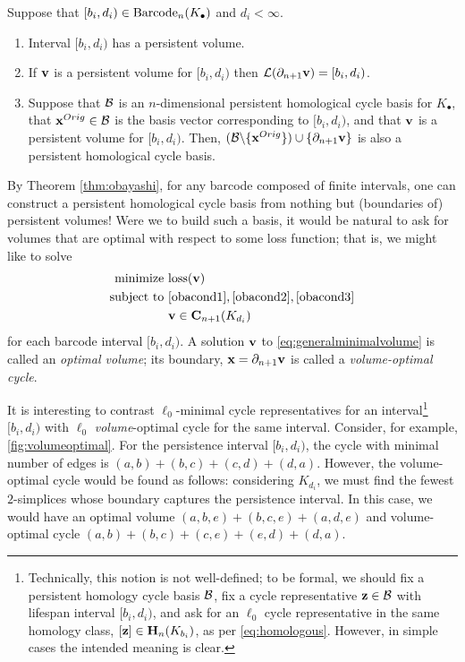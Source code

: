 %
\begin{theorem}  
\label{thm:obayashi}
Suppose that $[b_i, d_i) \in \mathrm{Barcode}_n(K_\bullet)$ and  $d_i < \infty$.
    \begin{enumerate}
        \item Interval $[b_i, d_i)$ has a persistent volume.
        \item If $\mathbf{v}$ is a persistent volume for $[b_i, d_i)$ then $\mathcal{L}(\partial_{n+1}\mathbf{v}) = [b_i, d_i)$.
        \item Suppose that $\mathcal B$ is an $n$-dimensional persistent homological cycle basis for $K_\bullet$, that $\mathbf{x}^{Orig} \in \mathcal B$ is the basis vector corresponding to $[b_i, d_i)$, and that $\mathbf{v}$ is a persistent volume for $[b_i, d_i)$.  Then, $(\mathcal B \backslash \{\mathbf{x}^{Orig}\}) \cup \{\partial_{n+1}\mathbf{v}\} $  
        is also a persistent homological cycle basis.
    \end{enumerate}
\end{theorem}

By Theorem \ref{thm:obayashi}, for any barcode composed of finite intervals, one can construct a persistent homological cycle basis from nothing but (boundaries of) persistent volumes!  Were we to build such a basis, it would be natural to ask for volumes that are optimal with respect to some loss function; that is, we might like to solve
\begin{align}
\begin{split}
    \text{minimize } & \mathrm{loss}(\mathbf{v}) \\
    \text{subject to } 
    & \eqref{obacond1}, \eqref{obacond2}, \eqref{obacond3}\\
    & \textbf{v} \in \mathbf{C}_{n+1}(K_{d_i}) 
\end{split}
\label{eq:generalminimalvolume}
\end{align}
for each barcode interval $[b_i, d_i)$.  A solution $\mathbf{v}$ to \pr \eqref{eq:generalminimalvolume} is called an \emph{optimal volume}; its boundary, $\mathbf{x}=\partial_{n+1}\mathbf{v}$ is called a \emph{volume-optimal cycle}.

It is interesting to contrast $\ell_0$-minimal cycle representatives for an interval\footnote{Technically, this notion is not well-defined; to be formal, we should fix a persistent homology cycle basis $\mathcal B$, fix a cycle representative ${\mathbf z} \in \mathcal B$ with lifespan interval $[b_i, d_i)$, and ask for an $\ell_0$ cycle representative in the same homology class, $[{\mathbf z}] \in \mathbf{H}_n(K_{b_i})$, as per \pr \eqref{eq:homologous}.  However, in simple cases the intended meaning is clear.} $[b_i, d_i)$ with  $\ell_0$ \emph{volume}-optimal cycle for the same interval.  Consider, for example, \fig \ref{fig:volumeoptimal}.  For the persistence interval $[b_i,d_i)$, the cycle with minimal number of edges is $(a,b) + (b,c) + (c,d)  + (d,a)$. However, the volume-optimal cycle would be found as follows: considering $K_{d_i}$, we must find the fewest $2$-simplices whose boundary captures the persistence interval. In this case, we would have an optimal volume  $(a,b,e) + (b,c,e) + (a,d,e)$ and volume-optimal cycle $(a,b)+ (b,c) + (c,e) + (e,d)+ (d,a)$.


